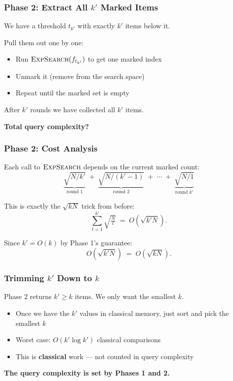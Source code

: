 \documentclass[xcolor=table]{beamer}
\theoremstyle{remark}
\theoremstyle{plain}
\begin{document}
\begin{frame}
  \frametitle{Phase 2: Extract All $k'$ Marked Items}
  We have a threshold $t_{k'}$ with exactly $k'$ items below it.

  \vspace{0.5cm}
  Pull them out one by one:
  \begin{itemize}
    \item Run $\textsc{ExpSearch}(f_{t_{k'}})$ to get one marked index
    \item Unmark it (remove from the search space)
    \item Repeat until the marked set is empty
  \end{itemize}

  \vspace{0.5cm}
  After $k'$ rounds we have collected all $k'$ items.

  \vspace{0.6cm}
  \textbf{Total query complexity?}
\end{frame}

\begin{frame}
  \frametitle{Phase 2: Cost Analysis}
  Each call to $\textsc{ExpSearch}$ depends on the current marked count:
  \[
    \underbrace{\sqrt{N/k'}}_{\text{round 1}} \;+\; \underbrace{\sqrt{N/(k'-1)}}_{\text{round 2}} \;+\; \cdots \;+\; \underbrace{\sqrt{N/1}}_{\text{round } k'}
  \]

  \vspace{0.4cm}
  This is exactly the $\sqrt{kN}$ trick from before:
  \[
    \sum_{t=1}^{k'} \sqrt{\tfrac{N}{t}} \;=\; O(\sqrt{k'N}).
  \]

  \vspace{0.4cm}
  Since $k' = O(k)$ by Phase 1's guarantee:
  \[
    O(\sqrt{k'N}) \;=\; O(\sqrt{kN}).
  \]
\end{frame}

\begin{frame}
  \frametitle{Trimming $k'$ Down to $k$}
  Phase 2 returns $k' \ge k$ items. We only want the smallest $k$.

  \vspace{0.5cm}
  \begin{itemize}
    \item Once we have the $k'$ values in classical memory, just sort and pick the smallest $k$
    \item Worst case: $O(k' \log k')$ classical comparisons
    \item This is \textbf{classical} work --- not counted in query complexity
  \end{itemize}

  \vspace{0.5cm}
  \textbf{The query complexity is set by Phases 1 and 2.}
\end{frame}
\end{document}
